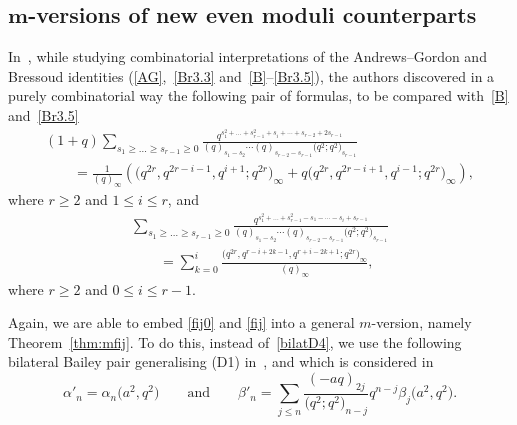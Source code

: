 \documentclass[pdftex]{sigma}
\numberwithin{equation}{section}
\begin{document}
\subsection[m-versions of new even moduli counterparts]{$\boldsymbol{m}$-versions of new even moduli counterparts}
In~\cite{DJK}, while studying combinatorial interpretations of the Andrews--Gordon and Bressoud identities (\eqref{AG},~\eqref{Br3.3} and~\eqref{B}--\eqref{Br3.5}), the authors discovered in a purely combinatorial way the following pair of formulas, to be compared with~\eqref{B} and~\eqref{Br3.5}
\begin{gather}
(1+q)\sum_{s_1\geq\dots\geq s_{r-1}\geq0}\frac{q^{s_1^2+\dots+s_{r-1}^2+s_{i}+\cdots+ s_{r-2}+2s_{r-1}}}{(q)_{s_1-s_2}\cdots(q)_{s_{r-2}-s_{r-1}}\bigl(q^2;q^2\bigr)_{s_{r-1}}}\nonumber\\
\qquad=\frac{1}{(q)_\infty}\left(\bigl(q^{2r},q^{2r-i-1},q^{i+1};q^{2r}\bigr)_\infty+q\bigl(q^{2r},q^{2r-i+1},q^{i-1};q^{2r}\bigr)_\infty\right),\label{fij0}
\end{gather}
where $r \geq 2$ and $1\leq i\leq r$, and
\begin{gather}
\sum_{s_1\geq\dots\geq s_{r-1}\geq0}\frac{q^{s_1^2+\dots+s_{r-1}^2-s_1-\cdots- s_i+s_{r-1}}}{(q)_{s_1-s_2}\cdots(q)_{s_{r-2}-s_{r-1}}\bigl(q^2;q^2\bigr)_{s_{r-1}}}\nonumber\\
\qquad=\sum_{k=0}^{i}\frac{\bigl(q^{2r},q^{r-i+2k-1},q^{r+i-2k+1};q^{2r}\bigr)_\infty}{(q)_\infty},\label{fij}
\end{gather}
where $r \geq 2$ and $0\leq i\leq r-1$.

Again, we are able to embed \eqref{fij0} and \eqref{fij} into a general $m$-version, namely Theorem~\ref{thm:mfij}. To do this, instead of~\eqref{bilatD4}, we use the following bilateral Bailey pair generalising (D1) in~\cite{BIS}, and which is considered in~\cite{J}
\begin{equation}\label{bilatD1}
\alpha'_n=\alpha_n\bigl(a^2,q^2\bigr)\qquad\mbox{and}\qquad\beta'_n=\sum_{j\leq n}\frac{(-aq)_{2j}}{\bigl(q^2;q^2\bigr)_{n-j}}q^{n-j}\beta_j\bigl(a^2,q^2\bigr).
\end{equation}
\end{document}
